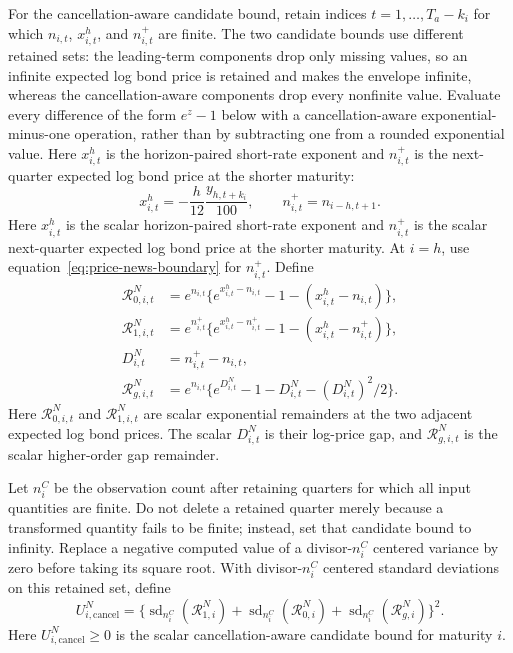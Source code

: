 \documentclass[11pt]{article}
\begin{document}
For the cancellation-aware candidate bound, retain indices \(t=1,\ldots,T_a-k_i\) for which
\(n_{i,t}\), \(x_{i,t}^h\), and \(n_{i,t}^{+}\) are finite. The two candidate bounds use different
retained sets: the leading-term components drop only missing values, so an infinite expected log bond
price is retained and makes the envelope infinite, whereas the cancellation-aware components drop
every nonfinite value. Evaluate every difference of the form \(e^{z}-1\) below with a
cancellation-aware exponential-minus-one operation, rather than by subtracting one from a rounded
exponential value. Here \(x_{i,t}^h\) is the
horizon-paired short-rate exponent and \(n_{i,t}^{+}\) is the next-quarter expected log bond price
at the shorter maturity:
\begin{equation*}
 x_{i,t}^h=-\frac{h}{12}\frac{y_{h,t+k_i}}{100},\qquad
 n_{i,t}^{+}=n_{i-h,t+1}.
\end{equation*}
Here \(x_{i,t}^h\) is the scalar horizon-paired short-rate exponent and \(n_{i,t}^+\) is the scalar
next-quarter expected log bond price at the shorter maturity. At \(i=h\), use
equation~\eqref{eq:price-news-boundary} for \(n_{i,t}^{+}\). Define
\begin{align*}
 \mathcal R_{0,i,t}^N&=e^{n_{i,t}}\{e^{x_{i,t}^h-n_{i,t}}-1-(x_{i,t}^h-n_{i,t})\},\\
 \mathcal R_{1,i,t}^N&=e^{n_{i,t}^{+}}\{e^{x_{i,t}^h-n_{i,t}^{+}}-1-(x_{i,t}^h-n_{i,t}^{+})\},\\
 D_{i,t}^{N}&=n_{i,t}^{+}-n_{i,t},\\
 \mathcal R_{g,i,t}^N&=e^{n_{i,t}}\{e^{D_{i,t}^{N}}-1-D_{i,t}^{N}-(D_{i,t}^{N})^2/2\}.
\end{align*}
Here \(\mathcal R_{0,i,t}^N\) and \(\mathcal R_{1,i,t}^N\) are scalar exponential remainders at
the two adjacent expected log bond prices. The scalar \(D_{i,t}^N\) is their log-price gap, and
\(\mathcal R_{g,i,t}^N\) is the scalar higher-order gap remainder.

Let \(n_i^C\) be the observation count after retaining quarters for which all input quantities are
finite. Do not delete
a retained quarter merely because a transformed quantity fails to be finite; instead, set that
candidate bound to infinity. Replace a negative computed value of a divisor-\(n_i^C\) centered
variance by zero before taking its square root. With divisor-\(n_i^C\) centered standard deviations on
this retained set, define
\begin{equation*}
 U_{i,\mathrm{cancel}}^N=
 \{\operatorname{sd}_{n_i^C}(\mathcal R_{1,i}^N)+\operatorname{sd}_{n_i^C}(\mathcal R_{0,i}^N)
   +\operatorname{sd}_{n_i^C}(\mathcal R_{g,i}^N)\}^2.
\end{equation*}
Here \(U_{i,\mathrm{cancel}}^N\ge0\) is the scalar cancellation-aware candidate bound for maturity
\(i\).
\end{document}
